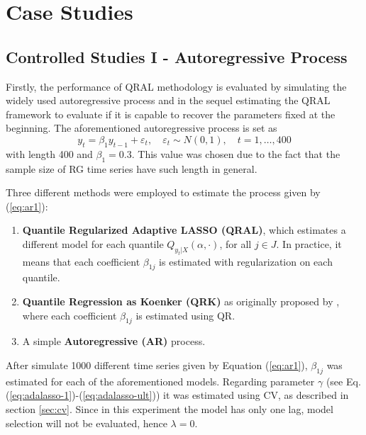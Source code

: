 \section{Case Studies}


\subsection{Controlled Studies I - Autoregressive Process} \label{sec:ar-study}


Firstly, the performance of QRAL methodology is evaluated by simulating the widely used autoregressive process and in the sequel estimating the QRAL framework to evaluate if it is capable to recover the parameters fixed at the beginning. 
The aforementioned autoregressive process is set as
\begin{equation}
y_t = \beta_1 y_{t-1} + \varepsilon_t, \quad \varepsilon_t \sim N(0, 1), \quad t=1,\dots,400 \label{eq:ar1}
\end{equation}
with length 400 and $\beta_1 = 0.3$. This value was chosen due to the fact that the sample size of RG time series have such length in general.

Three different methods were employed to estimate the process given by (\ref{eq:ar1}):
\begin{enumerate}
\item \textbf{Quantile Regularized Adaptive LASSO (QRAL)}, which estimates a different model for each quantile $Q_{y_t|X}(\alpha,\cdot)$, for all ${j \in J}$. In practice, it means that each coefficient $\beta_{1j}$ is estimated with regularization on each quantile. %
\item \textbf{Quantile Regression as Koenker (QRK)} as originally proposed by \cite{koenker1978regression}, where each coefficient $\beta_{1j}$ is estimated using QR. 
\item A simple \textbf{Autoregressive (AR)} process.%


\end{enumerate}

After simulate 1000 different time series given by Equation (\ref{eq:ar1}), $\beta_{1j}$ was estimated for each of the aforementioned models. Regarding parameter $\gamma$ (see Eq. (\ref{eq:adalasso-1})-(\ref{eq:adalasso-ult})) it was estimated using CV, as described in section \ref{sec:cv}. Since in this experiment the model has only one lag, model selection will not be evaluated, hence $\lambda=0$.

